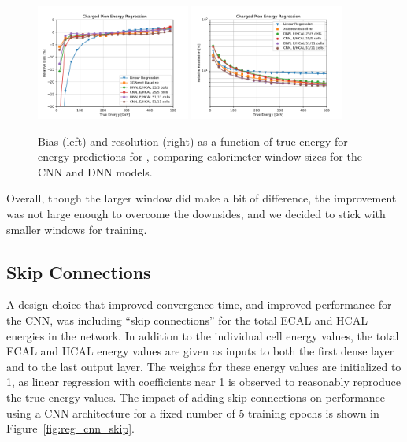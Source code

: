 \begin{figure}[htbp]
\centering
\includegraphics[width=0.45\textwidth]{Images/Calo/bias_vs_E_ChPiFixed_Cut30_nn_numcells.pdf}
\includegraphics[width=0.45\textwidth]{Images/Calo/res_vs_E_ChPiFixed_Cut30_nn_numcells_fits.pdf}
\caption{Bias (left) and resolution (right) as a function of true energy for energy predictions for \chpi, comparing calorimeter window sizes for the CNN and DNN models.
}
\label{fig:reg_nn_numcells_chpi_large_window}
\end{figure}

Overall, though the larger window did make a bit of difference, the improvement was not large enough to overcome the downsides, and we decided to stick with smaller windows for training.

\subsection*{Skip Connections}

A design choice that improved convergence time, and improved performance for the CNN, was including ``skip connections'' for the total ECAL and HCAL energies in the network.  In addition to the individual cell energy values, the total ECAL and HCAL energy values are given as inputs to both the first dense layer and to the last output layer.  The weights for these energy values are initialized to 1, as linear regression with coefficients near 1 is observed to reasonably reproduce the true energy values.  The impact of adding skip connections on performance using a CNN architecture for a fixed number of 5 training epochs is shown in Figure~\ref{fig:reg_cnn_skip}.

